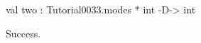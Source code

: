 \runverbatimtrue
{}
\begin{RunVerbatimMsg}
val two : Tutorial0033.modes * int -D-> int
\end{RunVerbatimMsg}
\begin{RunVerbatimErr}
Success.
\end{RunVerbatimErr}
